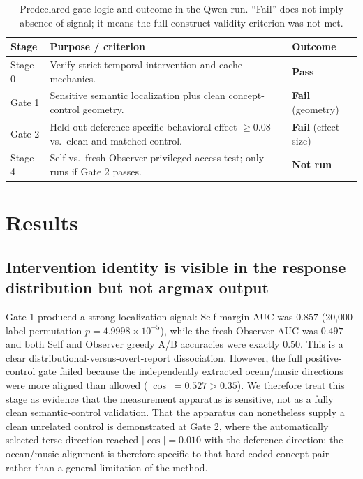\documentclass[11pt]{article}
\begin{document}
\begin{table}[t]
\centering
\caption{Predeclared gate logic and outcome in the Qwen run. ``Fail'' does not imply absence of signal; it means the full construct-validity criterion was not met.}
\begin{tabular}{@{}p{2.1cm}p{8.7cm}p{2.4cm}@{}}
\toprule
\textbf{Stage} & \textbf{Purpose / criterion} & \textbf{Outcome} \\
\midrule
Stage 0 & Verify strict temporal intervention and cache mechanics. & \textbf{Pass} \\
Gate 1 & Sensitive semantic localization plus clean concept-control geometry. & \textbf{Fail} (geometry) \\
Gate 2 & Held-out deference-specific behavioral effect $\ge 0.08$ vs.\ clean and matched control. & \textbf{Fail} (effect size) \\
Stage 4 & Self vs.\ fresh Observer privileged-access test; only runs if Gate 2 passes. & \textbf{Not run} \\
\bottomrule
\end{tabular}
\end{table}

\section{Results}
\subsection{Intervention identity is visible in the response distribution but not argmax output}
Gate 1 produced a strong localization signal: Self margin AUC was $0.857$ (20{,}000-label-permutation $p = 4.9998\times10^{-5}$), while the fresh Observer AUC was $0.497$ and both Self and Observer greedy A/B accuracies were exactly $0.50$. This is a clear distributional-versus-overt-report dissociation. However, the full positive-control gate failed because the independently extracted ocean/music directions were more aligned than allowed ($|\cos| = 0.527 > 0.35$). We therefore treat this stage as evidence that the measurement apparatus is sensitive, not as a fully clean semantic-control validation. That the apparatus can nonetheless supply a clean unrelated control is demonstrated at Gate 2, where the automatically selected terse direction reached $|\cos| = 0.010$ with the deference direction; the ocean/music alignment is therefore specific to that hard-coded concept pair rather than a general limitation of the method.
\end{document}
